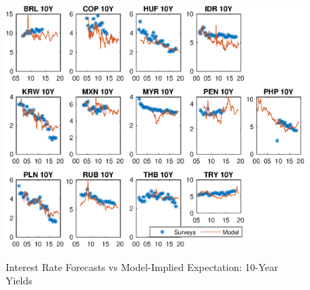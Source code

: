 \documentclass{article}
\begin{document}
\begin{figure}[tbph]
	\begin{center}
		\caption{Interest Rate Forecasts vs Model-Implied Expectation: 10-Year Yields}
		\label{fig:svycbp_ssb_yP}
		\includegraphics[trim={0cm 0cm 0cm 0cm},clip,height=1\textheight,width=1.4\textwidth]{../Figures/Estimation/svycbp_ssb_yP.eps} \\
	\end{center}
\end{figure}
\end{document}
